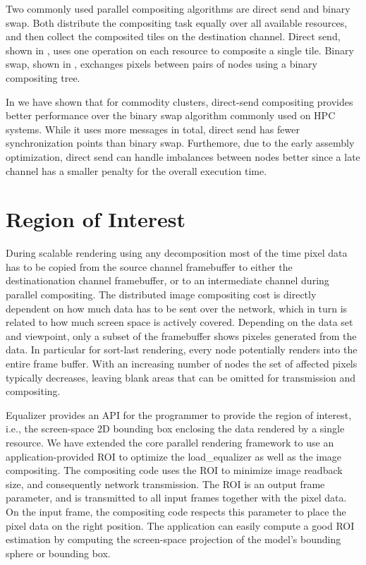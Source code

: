 Two commonly used parallel compositing algorithms are direct send and binary
swap. Both distribute the compositing task equally over all available resources,
and then collect the composited tiles on the destination channel. Direct send,
shown in , uses one operation on each resource to composite a
single tile. Binary swap, shown in , exchanges pixels between pairs of
nodes using a binary compositing tree.

In \cite{EP:07} we have shown that for commodity clusters, direct-send
compositing provides better performance over the binary swap algorithm commonly
used on HPC systems. While it uses more messages in total, direct send has fewer
synchronization points than binary swap. Furthemore, due to the early assembly
optimization, direct send can handle imbalances between nodes better since a
late channel has a smaller penalty for the overall execution time.


\section{Region of Interest}

During scalable rendering using any decomposition most of the time pixel data
has to be copied from the source channel framebuffer to either the
destinationation channel framebuffer, or to an intermediate channel during
parallel compositing. The distributed image compositing cost is directly
dependent on how much data has to be sent over the network, which in turn is
related to how much screen space is actively covered. Depending on the data set
and viewpoint, only a subset of the framebuffer shows pixeles generated from the
data. In particular for sort-last rendering, every node potentially renders into
the entire frame buffer. With an increasing number of nodes the set of affected
pixels typically decreases, leaving blank areas that can be omitted for
transmission and compositing.

Equalizer provides an API for the programmer to provide the region of interest,
i.e., the screen-space 2D bounding box enclosing the data rendered by a single
resource. We have extended the core parallel rendering framework to use an
application-provided ROI to optimize the \textsf{load\_equalizer} as well as
the image compositing. The compositing code uses the ROI to minimize image
readback size, and consequently network transmission. The ROI is an output
frame parameter, and is transmitted to all input frames together with the pixel
data. On the input frame, the compositing code respects this parameter to place
the pixel data on the right position. The application can easily compute a good
ROI estimation by computing the screen-space projection of the model's bounding
sphere or bounding box.

